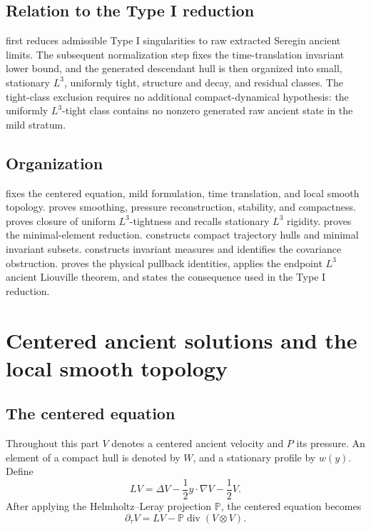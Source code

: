 \documentclass[11pt]{amsart}
\theoremstyle{plain}
\theoremstyle{definition}
\theoremstyle{remark}
\numberwithin{equation}{section}
\newcommand{\divergence}{\operatorname{div}}
\begin{document}
\subsection{Relation to the Type I reduction}

 first reduces admissible Type I singularities
to raw extracted Seregin ancient limits.  The subsequent normalization step
fixes the time-translation invariant lower bound, and the generated descendant
hull is then organized into small, stationary \(L^3\), uniformly tight,
structure and decay, and residual classes.
The tight-class exclusion requires no additional compact-dynamical hypothesis:
the uniformly \(L^3\)-tight class contains no
nonzero generated raw ancient state in the mild stratum.

\subsection{Organization}

 fixes the centered equation, mild formulation,
time translation, and local smooth topology.  
proves smoothing, pressure reconstruction, stability, and compactness.
 proves closure of uniform \(L^3\)-tightness and
recalls stationary \(L^3\) rigidity.   proves the
minimal-element reduction.   constructs compact
trajectory hulls and minimal invariant subsets.  
constructs invariant measures and identifies the covariance obstruction.
 proves the physical pullback identities,
applies the endpoint \(L^3\) ancient Liouville theorem, and states the
consequence used in the Type I reduction.

\section{Centered ancient solutions and the local smooth topology}
\label{p2:sec:centered-topology}

\subsection{The centered equation}

Throughout this part \(V\) denotes a centered ancient velocity and \(P\) its
pressure.  An element of a compact hull is denoted by \(W\), and a
stationary profile by \(w(y)\).  Define
\[
   L V=\Delta V-\frac12 y\cdot\nabla V-\frac12 V .
\]
After applying the Helmholtz--Leray projection \(\mathbb P\), the centered
equation becomes
\begin{equation}\label{p2:eq:projected}
   \partial_\tau V
   =
   LV-\mathbb P\divergence(V\otimes V).
\end{equation}
\end{document}
